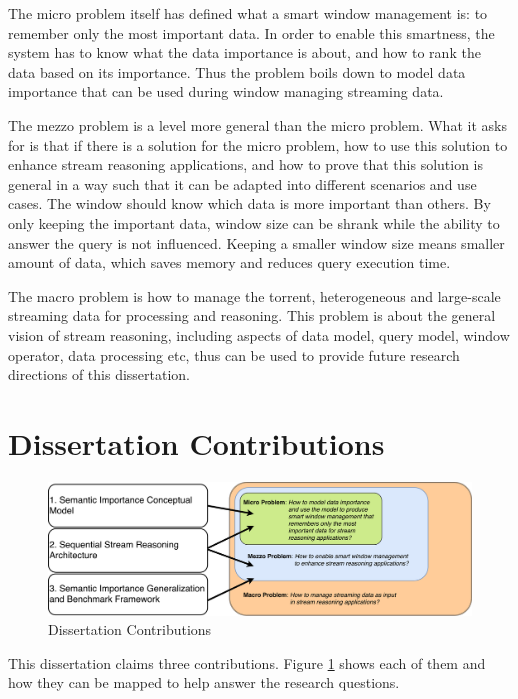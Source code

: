 The micro problem itself has defined what a smart window management is: to remember only the most important data. 
In order to enable this smartness, the system has to know what the data importance is about, and how to rank the data based on its importance. 
Thus the problem boils down to model data importance that can be used during window managing streaming data. 

The mezzo problem is a level more general than the micro problem.
What it asks for is that if there is a solution for the micro problem, how to use this solution to enhance stream reasoning applications, and how to prove that this solution is general in a way such that it can be adapted into different scenarios and use cases. 
The window should know which data is more important than others. 
By only keeping the important data, window size can be shrank while the ability to answer the query is not influenced.
Keeping a smaller window size means smaller amount of data, which saves memory and reduces query execution time. 

The macro problem is how to manage the torrent, heterogeneous and large-scale streaming data for processing and reasoning. 
This problem is about the general vision of stream reasoning, including aspects of data model, query model, window operator, data processing etc, thus can be used to provide future research directions of this dissertation.  
%
\section{Dissertation Contributions}

\begin{figure}[!htbp]
	\centering
    \includegraphics[width=5in]{img/1-dc.pdf}
    \caption{Dissertation Contributions}
    \label{fig:1-dc}
\end{figure}

This dissertation claims three contributions.
Figure \ref{fig:1-dc} shows each of them and how they can be mapped to help answer the research questions.

